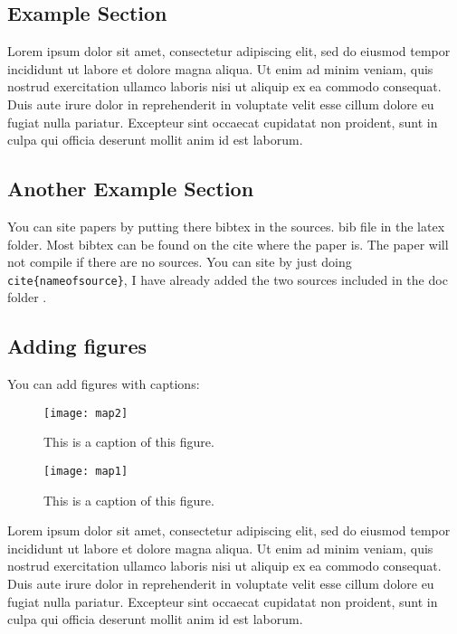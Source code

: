 \subsection{Example Section}

Lorem ipsum dolor sit amet, consectetur adipiscing elit,
sed do eiusmod tempor incididunt ut labore et dolore magna aliqua. Ut enim ad
minim veniam, quis nostrud exercitation ullamco laboris nisi ut aliquip ex ea
commodo consequat. Duis aute irure dolor in reprehenderit in voluptate velit
esse cillum dolore eu fugiat nulla pariatur. Excepteur sint occaecat cupidatat
non proident, sunt in culpa qui officia deserunt mollit anim id est laborum.


\subsection{Another Example Section}

You can site papers by putting there bibtex in the sources. bib file in the latex
folder. Most bibtex can be found on the cite where the paper is. The paper will not
compile if there are no sources. You can site by just doing \texttt{\\cite\{nameofsource\}},
I have already added the two sources included in the doc folder \cite{behaviortrees}\cite{pound}.

\subsection{Adding figures}

You can add figures with captions:

\begin{figure}[H]
  \centering
    \texttt{[image: map2]}
  \caption{This is a caption of this figure.}
  \label{fig:something1}
\end{figure}

\begin{figure}[H]
  \centering
    \texttt{[image: map1]}
  \caption{This is a caption of this figure.}
  \label{fig:something2}
\end{figure}

Lorem ipsum dolor sit amet, consectetur adipiscing elit,
sed do eiusmod tempor incididunt ut labore et dolore magna aliqua. Ut enim ad
minim veniam, quis nostrud exercitation ullamco laboris nisi ut aliquip ex ea
commodo consequat. Duis aute irure dolor in reprehenderit in voluptate velit
esse cillum dolore eu fugiat nulla pariatur. Excepteur sint occaecat cupidatat
non proident, sunt in culpa qui officia deserunt mollit anim id est laborum.

